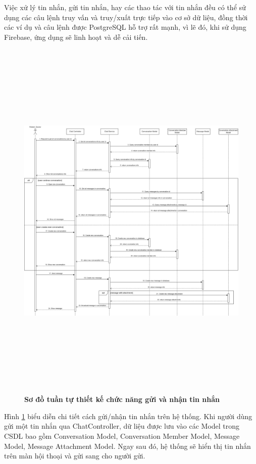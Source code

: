 Việc xử lý tin nhắn, gửi tin nhắn, hay các thao tác với tin nhắn đều có thể sử dụng
các câu lệnh truy vấn và truy/xuất trực tiếp vào cơ sở dữ liệu, đồng thời các ví dụ và câu
lệnh được PostgreSQL hỗ trợ rất mạnh, vì lẽ đó, khi sử dụng Firebase, ứng dụng
sẽ linh hoạt và dễ cải tiến.

\begin{figure}[H]
  \centering
  \includegraphics[width=16cm,height=18cm]{Images/sequence_api/sendGetMessage.png}
  \caption[Sơ đồ tuần tự thiết kế chức năng gửi và nhận tin nhắn]{\bfseries \fontsize{12pt}{0pt}
  \selectfont Sơ đồ tuần tự thiết kế chức năng gửi và nhận tin nhắn}
  \label{api_sendMessage} %
\end{figure}
Hình \ref{api_sendMessage} biểu diễn chi tiết cách gửi/nhận tin nhắn trên hệ thống. Khi người dùng gửi một tin nhắn qua ChatController, dữ liệu được lưu vào các Model trong CSDL bao gồm Conversation Model, 
Conversation Member Model, Message Model, Message Attachment Model. Ngay sau đó, hệ thống sẽ hiển thị tin nhắn trên màn hội thoại và gửi sang cho người gửi. 
